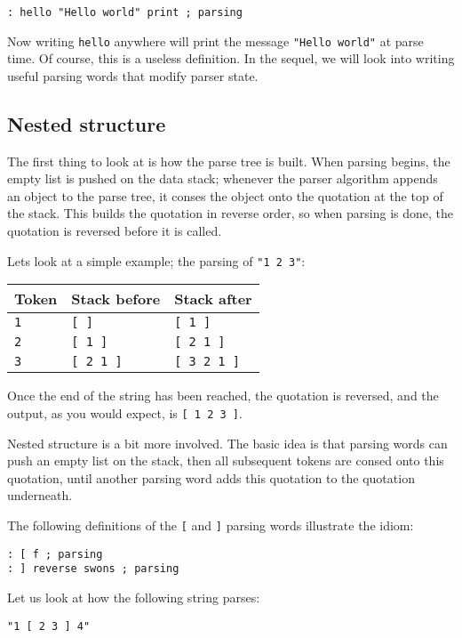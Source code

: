 \documentclass{book}
\begin{document}
\begin{verbatim}
: hello "Hello world" print ; parsing
\end{verbatim}

Now writing \texttt{hello} anywhere will print the message \texttt{"Hello world"} at parse time. Of course, this is a useless definition. In the sequel, we will look into writing useful parsing words that modify parser state.

\subsection{Nested structure}

The first thing to look at is how the parse tree is built. When parsing begins, the empty list is pushed on the data stack; whenever the parser algorithm appends an object to the parse tree, it conses the object onto the quotation at the top of the stack. This builds the quotation in reverse order, so when parsing is done, the quotation is reversed before it is called.

Lets look at a simple example; the parsing of \texttt{"1 2 3"}:

\begin{tabular}{l|l|l}
\hline
Token&Stack before&Stack after\\
\hline
\verb|1|&\verb|[ ]|&\verb|[ 1 ]|\\
\verb|2|&\verb|[ 1 ]|&\verb|[ 2 1 ]|\\
\verb|3|&\verb|[ 2 1 ]|&\verb|[ 3 2 1 ]|
\end{tabular}

Once the end of the string has been reached, the quotation is reversed, and the output, as you would expect, is \verb|[ 1 2 3 ]|.

Nested structure is a bit more involved. The basic idea is that parsing words can push an empty list on the stack, then all subsequent tokens are consed onto this quotation, until another parsing word adds this quotation to the quotation underneath.

The following definitions of the \verb|[| and \verb|]| parsing words illustrate the idiom:
\begin{verbatim}
: [ f ; parsing
: ] reverse swons ; parsing
\end{verbatim}

Let us look at how the following string parses:

\begin{verbatim}
"1 [ 2 3 ] 4"
\end{verbatim}
\end{document}
